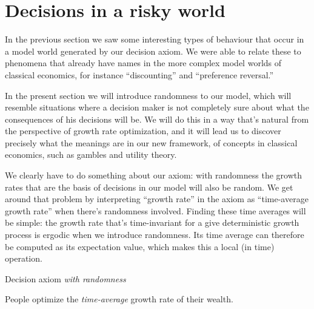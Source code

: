 \chapter{Decisions in a risky world}
In the previous section we saw some interesting types of behaviour that occur in a model world generated by our decision axiom. We were able to relate these to phenomena that already have names in the more complex model worlds of classical economics, for instance ``discounting'' and ``preference reversal.''

In the present section we will introduce randomness to our model, which will resemble situations where a decision maker is not completely sure about what the consequences of his decisions will be. We will do this in a way that's natural from the perspective of growth rate optimization, and it will lead us to discover precisely what the meanings are in our new framework, of concepts in classical economics, such as gambles and utility theory.

We clearly have to do something about our axiom: with randomness the growth rates that are the basis of decisions in our model will also be random. We get around that problem by interpreting ``growth rate'' in the axiom as ``time-average growth rate'' when there's randomness involved. Finding these time averages will be simple: the growth rate that's time-invariant for a give deterministic growth process is ergodic when we introduce randomness. Its time average can therefore be computed as its expectation value, which makes this a local (in time) operation.

\begin{keypts}{Decision axiom {\it with randomness}}

People optimize the {\it time-average} growth rate of their wealth.

\end{keypts}

